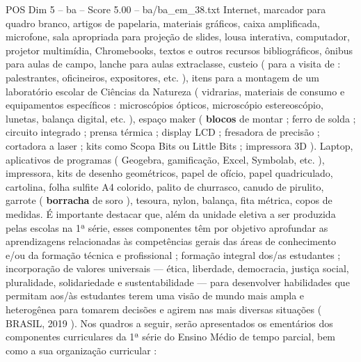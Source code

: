 \begin{textsample}{POS Dim 5 – ba – Score 5.00 – ba/ba\_em\_38.txt}
Internet, marcador para quadro branco, artigos de papelaria, materiais gráficos, caixa amplificada, microfone, sala apropriada para projeção de slides, lousa interativa, computador, projetor multimídia, Chromebooks, textos e outros recursos bibliográficos, ônibus para aulas de campo, lanche para aulas extraclasse, custeio ( para a visita de : palestrantes, oficineiros, expositores, etc. ), itens para a montagem de um laboratório escolar de Ciências da Natureza ( vidrarias, materiais de consumo e equipamentos específicos : microscópios ópticos, microscópio estereoscópio, lunetas, balança digital, etc. ), espaço maker ( \textbf{blocos} de montar ; ferro de solda ; circuito integrado ; prensa térmica ; display LCD ; fresadora de precisão ; cortadora a laser ; kits como Scopa Bits ou Little Bits ; impressora 3D ).
Laptop, aplicativos de programas ( Geogebra, gamificação, Excel, Symbolab, etc. ), impressora, kits de desenho geométricos, papel de ofício, papel quadriculado, cartolina, folha sulfite A4 colorido, palito de churrasco, canudo de pirulito, garrote ( \textbf{borracha} de soro ), tesoura, nylon, balança, fita métrica, copos de medidas.
É importante destacar que, além da unidade eletiva a ser produzida pelas escolas na 1ª série, esses componentes têm por objetivo aprofundar as aprendizagens relacionadas às competências gerais das áreas de conhecimento e/ou da formação técnica e profissional ; formação integral dos/as estudantes ; incorporação de valores universais — ética, liberdade, democracia, justiça social, pluralidade, solidariedade e sustentabilidade — para desenvolver habilidades que permitam aos/às estudantes terem uma visão de mundo mais ampla e heterogênea para tomarem decisões e agirem nas mais diversas situações ( BRASIL, 2019 ).
Nos quadros a seguir, serão apresentados os ementários dos componentes curriculares da 1ª série do Ensino Médio de tempo parcial, bem como a sua organização curricular :

\end{textsample}
